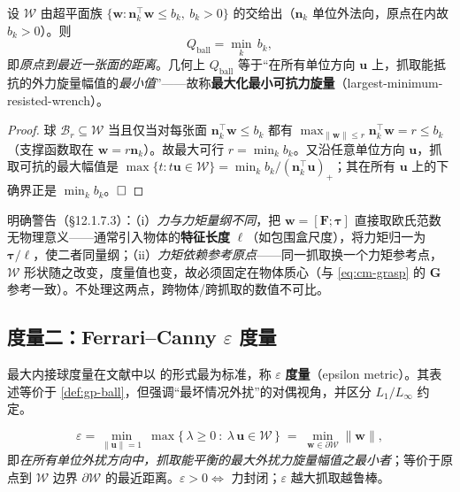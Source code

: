 \begin{proposition}[内接球半径 $=$ 最差方向的可抗力旋量]\label{prop:gp-ball-meaning}
设 $\mathcal{W}$ 由超平面族 $\{\mathbf{w}:\mathbf{n}_k^\top\mathbf{w}\le b_k,\ b_k>0\}$ 的交给出（$\mathbf{n}_k$ 单位外法向，原点在内故 $b_k>0$）。则
\begin{equation}
  Q_{\text{ball}}=\min_k\, b_k,
  \label{eq:gp-ball-faces}
\end{equation}
即\emph{原点到最近一张面的距离}。几何上 $Q_{\text{ball}}$ 等于“在所有单位方向 $\mathbf{u}$ 上，抓取能抵抗的外力旋量幅值的\emph{最小值}”——故称\textbf{最大化最小可抗力旋量}（largest-minimum-resisted-wrench）。
\end{proposition}
\begin{proof}
球 $\mathcal{B}_r\subseteq\mathcal{W}$ 当且仅当对每张面 $\mathbf{n}_k^\top\mathbf{w}\le b_k$ 都有 $\max_{\|\mathbf{w}\|\le r}\mathbf{n}_k^\top\mathbf{w}=r\le b_k$（支撑函数取在 $\mathbf{w}=r\mathbf{n}_k$）。故最大可行 $r=\min_k b_k$。又沿任意单位方向 $\mathbf{u}$，抓取可抗的最大幅值是 $\max\{t:t\mathbf{u}\in\mathcal{W}\}=\min_k b_k/(\mathbf{n}_k^\top\mathbf{u})_+$；其在所有 $\mathbf{u}$ 上的下确界正是 $\min_k b_k$。$\hfill\square$
\end{proof}

\begin{note}[两个必须当心的“单位/原点”陷阱]
\citeauthor{lynch2017modern}\cite{lynch2017modern}明确警告（§12.1.7.3）：（i）\emph{力与力矩量纲不同}，把 $\mathbf{w}=[\mathbf{F};\boldsymbol{\tau}]$ 直接取欧氏范数无物理意义——通常引入物体的\textbf{特征长度} $\ell$（如包围盒尺度），将力矩归一为 $\boldsymbol{\tau}/\ell$，使二者同量纲；（ii）\emph{力矩依赖参考原点}——同一抓取换一个力矩参考点，$\mathcal{W}$ 形状随之改变，度量值也变，故必须固定在物体质心（与 \cref{eq:cm-grasp} 的 $\mathbf{G}$ 参考一致）。不处理这两点，跨物体/跨抓取的数值不可比。
\end{note}

\subsection{度量二：Ferrari--Canny $\varepsilon$ 度量}
最大内接球度量在文献中以 \citeauthor{ferrari1992}\cite{ferrari1992} 的形式最为标准，称 $\varepsilon$ \textbf{度量}（epsilon metric）。其表述等价于 \cref{def:gp-ball}，但强调“最坏情况外扰”的对偶视角，并区分 $L_1/L_\infty$ 约定。

\begin{definition}\label{def:gp-epsilon}
\begin{equation}
  \varepsilon=\min_{\|\mathbf{u}\|=1}\ \max\{\,\lambda\ge 0\ :\ \lambda\,\mathbf{u}\in\mathcal{W}\,\}
  \;=\;\min_{\mathbf{w}\in\partial\mathcal{W}}\|\mathbf{w}\|,
  \label{eq:gp-epsilon}
\end{equation}
即\emph{在所有单位外扰方向中，抓取能平衡的最大外扰力旋量幅值之最小者}；等价于原点到 $\mathcal{W}$ 边界 $\partial\mathcal{W}$ 的最近距离。$\varepsilon>0\iff$ 力封闭；$\varepsilon$ 越大抓取越鲁棒。
\end{definition}

